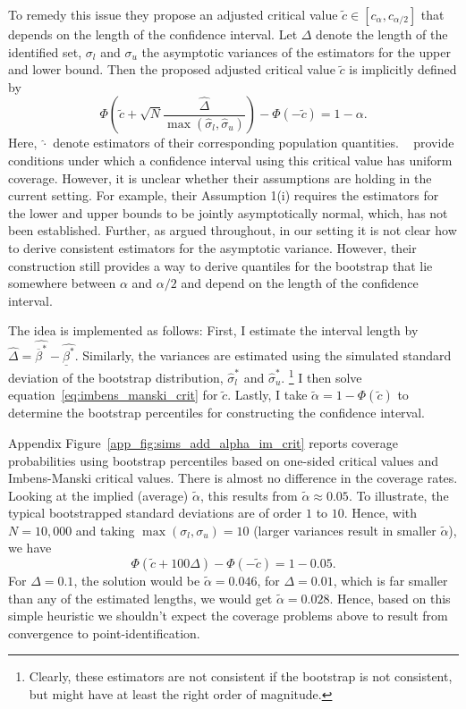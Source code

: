 \documentclass[12pt,a4paper,english]{article} %
\numberwithin{equation}{section}
\theoremstyle{definition}
\theoremstyle{remark}
\theoremstyle{plain}
\begin{document}
To remedy this issue they propose an adjusted critical value $\tilde{c}\in[c_{\alpha}, c_{\alpha/2}]$ that depends on the length of the confidence interval.
Let $\Delta$ denote the length of the identified set, $\sigma_l$ and $\sigma_u$ the asymptotic variances of the estimators for the upper and lower bound.
Then the proposed adjusted critical value $\tilde{c}$ is implicitly defined by
\begin{equation}\label{eq:imbens_manski_crit}
  \Phi\left(\tilde{c} + \sqrt{N}\frac{\hat{\Delta}}{\max(\hat{\sigma}_l, \hat{\sigma}_u)}\right) - \Phi\left(-\tilde{c}\right) = 1 - \alpha.
\end{equation}
Here, $\hat{\cdot}$ denote estimators of their corresponding population quantities.
~\cite{imbens2004confidence} provide conditions under which a confidence interval using this critical value has uniform coverage.
However, it is unclear whether their assumptions are holding in the current setting.
For example, their Assumption 1(i) requires the estimators for the lower and upper bounds to be jointly asymptotically normal, which, has not been established.
Further, as argued throughout, in our setting it is not clear how to derive consistent estimators for the asymptotic variance.
However, their construction still provides a way to derive quantiles for the bootstrap that lie somewhere between $\alpha$ and $\alpha/2$ and depend on the length of the confidence interval.

The idea is implemented as follows:
First, I estimate the interval length by $\hat{\Delta} = \hat{\overline{\beta}^*} - \hat{\underline{\beta}^*}$.
Similarly, the variances are estimated using the simulated standard deviation of the bootstrap distribution, $\hat{\sigma}_l^*$ and $\hat{\sigma}_u^*$.
\footnote{Clearly, these estimators are not consistent if the bootstrap is not consistent, but might have at least the right order of magnitude.}
I then solve equation~\ref{eq:imbens_manski_crit} for $\tilde{c}$.
Lastly, I take $\tilde{\alpha} = 1 - \Phi(\tilde{c})$ to determine the bootstrap percentiles for constructing the confidence interval.

Appendix Figure~\ref{app_fig:sims_add_alpha_im_crit} reports coverage probabilities using bootstrap percentiles based on one-sided critical values and Imbens-Manski critical values.
There is almost no difference in the coverage rates.
Looking at the implied (average) $\tilde{\alpha}$, this results from $\tilde{\alpha} \approx 0.05$.
To illustrate, the typical bootstrapped standard deviations are of order $1$ to $10$.
Hence, with $N = 10,000$ and taking $\max(\sigma_l, \sigma_u)=10$ (larger variances result in smaller $\tilde{\alpha}$), we have
\begin{equation*}
  \Phi\left(\tilde{c} + 100\Delta\right) - \Phi\left(-\tilde{c}\right) = 1 - 0.05.
\end{equation*}
For $\Delta=0.1$, the solution would be $\tilde{\alpha} = 0.046$, for $\Delta=0.01$, which is far smaller than any of the estimated lengths, we would get $\tilde{\alpha} = 0.028$.
Hence, based on this simple heuristic we shouldn't expect the coverage problems above to result from convergence to point-identification.
\end{document}

